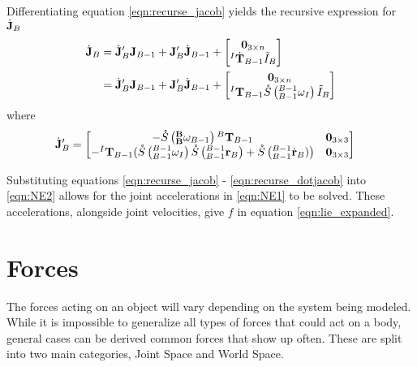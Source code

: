 \noindent Differentiating equation \ref{eqn:recurse_jacob} yields the recursive expression for $\dot{\mathbf{J}}_B$
\begin{align}
	\dot{\mathbf{J}}_B & = \dot{\mathbf{J}}_B' \mathbf{J}_{B-1} + \mathbf{J}_B' \dot{\mathbf{J}}_{B-1} + \begin{bmatrix} 
	{\mathbf{0}}_{3 \times n} \\
	{{^I\dot{\mathbf{T}}_{B-1}}\Tilde{I}_B} \\
	\end{bmatrix} \nonumber  \\
	        & = \dot{\mathbf{J}}_B' \mathbf{J}_{B-1} + \mathbf{J}_B' \dot{\mathbf{J}}_{B-1} + \begin{bmatrix} 
	{\mathbf{0}}_{3 \times n} \\
	{{^I{\mathbf{T}}_{B-1}}\mathring{S}\left(^{B-1}_{B-1}\omega_I\right)\Tilde{I}_B} \\
	\end{bmatrix}  
\end{align}
\noindent where
\begin{align} \label{eqn:recurse_dotjacob}
	\dot{\mathbf{J}}_B'                                                               & = \begin{bmatrix}  
	-\mathring{S}\left(^\mathbf{B}_\mathbf{B}\omega_{B-1}\right){^B\mathbf{T}_{B-1}}                                       & {\mathbf{0}}_{3 \times 3} \\
	-{^I\mathbf{T}_{B-1}}
	(\mathring{S}\left(^{B-1}_{B-1}\omega_I\right)\mathring{S}\left(^{B-1}_{B-1}\mathbf{r}_B\right)+\mathring{S}\left(^{B-1}_{B-1}\dot{\mathbf{r}}_B)\right) & {\mathbf{0}}_{3 \times 3} \\
	\end{bmatrix}
\end{align}

\noindent Substituting equations \ref{eqn:recurse_jacob} - \ref{eqn:recurse_dotjacob} into \ref{eqn:NE2} allows for the joint accelerations in  \ref{eqn:NE1} to be solved. These accelerations, alongside joint velocities, give $f$ in equation \ref{eqn:lie_expanded}.

\section{Forces} \label{sec:forces}

\noindent The forces acting on an object will vary depending on the system being modeled. While it is impossible to generalize all types of forces that could act on a body, general cases can be derived common forces that show up often. These are split into two main categories, Joint Space and World Space. 

